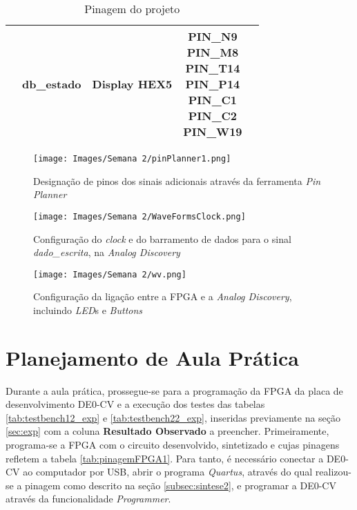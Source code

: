 \documentclass[amsmath,amssymb,floatfix]{report}
\begin{document}
\begin{table}[H]
\begin{tabular}{c|c|c|c|c|}
\multicolumn{1}{|c|}{}                           & db\_estado              & Display HEX5 & \thead{PIN\_N9 \\ PIN\_M8 \\ PIN\_T14 \\  PIN\_P14 \\  PIN\_C1 \\ PIN\_C2 \\ PIN\_W19}                                                                       & \multicolumn{1}{l|}{}          \\ \hline
\end{tabular}
\caption{Pinagem do projeto}
\label{tab:pinagemFPGA2}
\end{table}

\begin{figure}[H]
\centering
\texttt{[image: Images/Semana 2/pinPlanner1.png]} 
    \caption{Designação de pinos dos sinais adicionais através da ferramenta \textit{Pin Planner}}
    \label{fig:pinPlanner12}
\end{figure} 

\begin{figure}[H]
\centering
\texttt{[image: Images/Semana 2/WaveFormsClock.png]} 
    \caption{Configuração do \textit{clock} e do barramento de dados para o sinal \textit{dado\_escrita}, na \textit{Analog Discovery}}
    \label{fig:wfClock2}
\end{figure} 

\begin{figure}[H]
\centering
\texttt{[image: Images/Semana 2/wv.png]} 
    \caption{Configuração da ligação entre a FPGA e a \textit{Analog Discovery}, incluindo \textit{LED}s e \textit{Buttons}}
    \label{fig:wv2}
\end{figure}

\section{Planejamento de Aula Prática}

Durante a aula prática, prossegue-se para a programação da FPGA da placa de desenvolvimento DE0-CV e a execução dos testes das tabelas \ref{tab:testbench12_exp} e \ref{tab:testbench22_exp}, inseridas previamente na seção \ref{sec:exp} com a coluna \textbf{Resultado Observado} a preencher. Primeiramente, programa-se a FPGA com o circuito desenvolvido, sintetizado e cujas pinagens refletem a tabela \ref{tab:pinagemFPGA1}. Para tanto, é necessário conectar a DE0-CV ao computador por USB, abrir o programa \textit{Quartus}, através do qual realizou-se a pinagem como descrito na seção \ref{subsec:sintese2}, e programar a DE0-CV através da funcionalidade \textit{Programmer}. 
\end{document}
